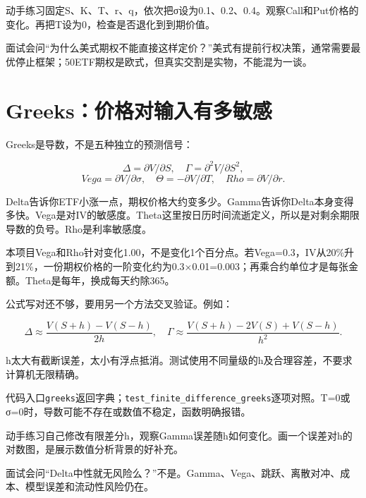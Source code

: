 \documentclass[UTF8,11pt,a4paper]{ctexart}
\begin{document}
\begin{learningbox}{动手练习}固定S、K、T、r、q，依次把σ设为0.1、0.2、0.4。观察Call和Put价格的变化。再把T设为0，检查是否退化到到期价值。\end{learningbox}

\begin{learningbox}{面试会问}“为什么美式期权不能直接这样定价？”美式有提前行权决策，通常需要最优停止框架；50ETF期权是欧式，但真实交割是实物，不能混为一谈。\end{learningbox}


\section{Greeks：价格对输入有多敏感}

Greeks是导数，不是五种独立的预测信号：

\[
\Delta=\partial V/\partial S,\quad \Gamma=\partial^2V/\partial S^2,
\]
\[
Vega=\partial V/\partial\sigma,\quad \Theta=-\partial V/\partial T,\quad Rho=\partial V/\partial r.
\]

Delta告诉你ETF小涨一点，期权价格大约变多少。Gamma告诉你Delta本身变得多快。Vega是对IV的敏感度。Theta这里按日历时间流逝定义，所以是对剩余期限导数的负号。Rho是利率敏感度。

本项目Vega和Rho针对变化1.00，不是变化1个百分点。若Vega=0.3，IV从20\%升到21\%，一份期权价格的一阶变化约为0.3×0.01=0.003；再乘合约单位才是每张金额。Theta是每年，换成每天约除365。

公式写对还不够，要用另一个方法交叉验证。例如：

\[
\Delta\approx\frac{V(S+h)-V(S-h)}{2h},\quad
\Gamma\approx\frac{V(S+h)-2V(S)+V(S-h)}{h^2}.
\]

h太大有截断误差，太小有浮点抵消。测试使用不同量级的h及合理容差，不要求计算机无限精确。

\begin{learningbox}{代码入口}\texttt{greeks}返回字典；\texttt{test\_finite\_difference\_greeks}逐项对照。T=0或σ=0时，导数可能不存在或数值不稳定，函数明确报错。\end{learningbox}

\begin{learningbox}{动手练习}自己修改有限差分h，观察Gamma误差随h如何变化。画一个误差对h的对数图，是展示数值分析背景的好补充。\end{learningbox}

\begin{learningbox}{面试会问}“Delta中性就无风险么？”不是。Gamma、Vega、跳跃、离散对冲、成本、模型误差和流动性风险仍在。\end{learningbox}
\end{document}
